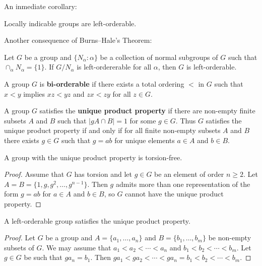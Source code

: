 An inmediate corollary:

\begin{corollary}
	Locally indicable groups are left-orderable. 
\end{corollary}

Another consequence of Burns--Hale's Theorem:

\begin{exercise}
	Let $G$ be a group and $\{N_\alpha:\alpha\}$ be a collection of normal subgroups of $G$ such that
	$\cap_{\alpha}N_\alpha=\{1\}$. If $G/N_{\alpha}$ is left-ordererable for all $\alpha$, then 
	$G$ is left-orderable. 
\end{exercise}

A group $G$ is \textbf{bi-orderable} if there exists a total ordering $<$ in $G$ 
such that $x<y$ implies $xz<yz$ and $zx<zy$ for all $z\in G$. 

A group $G$ satisfies the \textbf{unique product property} if there are non-empty
finite subsets $A$ and $B$ such that $|gA\cap B|=1$ for some $g\in G$. Thus $G$ 
satisfies the unique product property if and only if for all finite non-empty subsets
$A$ and $B$ there exists $g\in G$ such that $g=ab$ for unique elements 
$a\in A$ and $b\in B$.  

\begin{proposition}
	A group with the unique product property is torsion-free.	
\end{proposition}

\begin{proof}
	Assume that $G$ has torsion and let $g\in G$ be an element of order $n\geq2$. 
	Let $A=B=\{1,g,g^2,\dots,g^{n-1}\}$. Then $g$ admits more than one representation
	of the form $g=ab$ for $a\in A$ and $b\in B$, so $G$ cannot have the unique product property. 
\end{proof}

\begin{proposition}
	A left-orderable group satisfies the unique product property.
\end{proposition}

\begin{proof}
	Let $G$ be a group and 
    $A=\{a_1,\dots,a_n\}$ and $B=\{b_1,\dots,b_m\}$ be non-empty 
    subsets of $G$. We may assume that $a_1<a_2<\cdots<a_n$ and
    $b_1<b_2<\cdots<b_m$. Let $g\in G$ be such that $ga_n=b_1$. Then
    $ga_1<ga_2<\cdots<ga_n=b_1<b_2<\cdots<b_m$. 
\end{proof}

